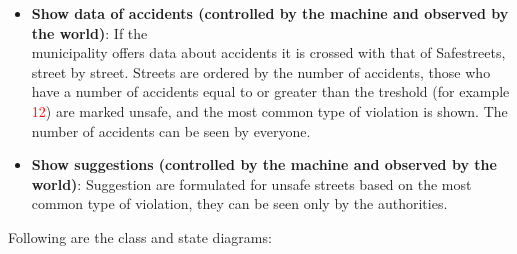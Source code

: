\begin{itemize}
\item \textbf{Show data of accidents (controlled by the machine and observed by the world)}: If the \\ municipality offers data about accidents it is crossed with that of Safestreets, street by street. Streets are ordered by the number of accidents, those who have a number of accidents equal to or greater than the treshold (for example \textcolor{Red}{12}) are marked unsafe, and the most common type of violation is shown. The number of accidents can be seen by everyone.

\item \textbf{Show suggestions (controlled by the machine and observed by the world)}: Suggestion are formulated for unsafe streets based on the most common type of violation, they can be seen only by the authorities.

\end{itemize}

Following are the class and state diagrams:

